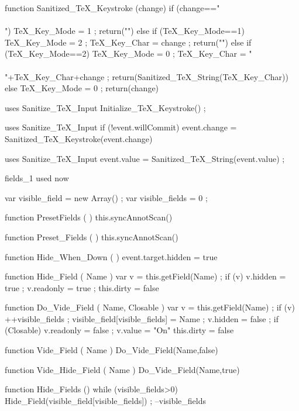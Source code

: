   function Sanitized_TeX_Keystroke (change)
    { if (change=="\\\\")
        { TeX_Key_Mode = 1 ;
          return("") }
      else if (TeX_Key_Mode==1)
        { TeX_Key_Mode = 2 ;
          TeX_Key_Char = change ;
          return("") }
      else if (TeX_Key_Mode==2)
        { TeX_Key_Mode = 0 ;
          TeX_Key_Char = "\\\\"+TeX_Key_Char+change ;
          return(Sanitized_TeX_String(TeX_Key_Char)) }
      else
        { TeX_Key_Mode = 0 ;
          return(change) } }

\stopJSpreamble

 uses {Sanitize_TeX_Input}
  Initialize_TeX_Keystroke() ;
\stopJScode

 uses {Sanitize_TeX_Input}
  if (!event.willCommit)
    { event.change = Sanitized_TeX_Keystroke(event.change) }
\stopJScode

 uses {Sanitize_TeX_Input}
  event.value = Sanitized_TeX_String(event.value) ;
\stopJScode

\startJSpreamble fields_1 used now

var visible_field  = new Array() ;
var visible_fields = 0 ;

function PresetFields ( )
  { this.syncAnnotScan() }

function Preset_Fields ( )
  { this.syncAnnotScan() }

function Hide_When_Down ( )
  { event.target.hidden = true }

function Hide_Field ( Name )
  { var v = this.getField(Name) ;
    if (v)
      { v.hidden = true ;
        v.readonly = true ;
        this.dirty = false } }

function Do_Vide_Field ( Name, Closable )
  { var v = this.getField(Name) ;
    if (v)
      { ++visible_fields ;
        visible_field[visible_fields] = Name ;
        v.hidden = false ;
        if (Closable)
          { v.readonly = false ;
            v.value = "On" }
        this.dirty = false } }

function Vide_Field ( Name )
  { Do_Vide_Field(Name,false) }

function Vide_Hide_Field ( Name )
  { Do_Vide_Field(Name,true) }

function Hide_Fields ()
  { while (visible_fields>0)
      { Hide_Field(visible_field[visible_fields]) ;
        --visible_fields } }

